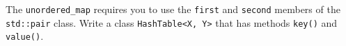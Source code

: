   The \verb!unordered_map! requires you to use the
  \verb!first! and \verb!second! members of the
  \verb!std::pair! class.
  Write a class \verb!HashTable<X, Y>! that has
  methods \verb!key()! and \verb!value()!.
